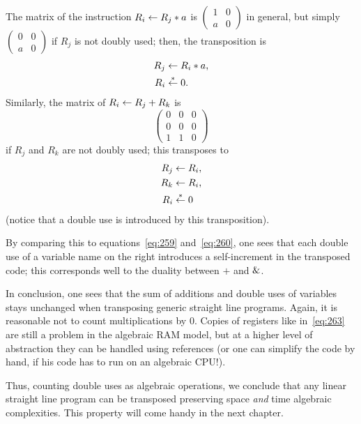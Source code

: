 The matrix of the instruction $R_i\leftarrow R_j*a$ is
$\left(\begin{smallmatrix}1&0\\a&0\end{smallmatrix}\right)$ in
general, but simply
$\left(\begin{smallmatrix}0&0\\a&0\end{smallmatrix}\right)$ if $R_j$
is not doubly used; then, the transposition is
\begin{equation}
  \label{eq:262}
  \begin{aligned}
    R_j&\leftarrow R_i*a\text{,}\\
    R_i&\overset{*}{\leftarrow} 0\text{.}
  \end{aligned}
\end{equation}
Similarly, the matrix of $R_i\leftarrow R_j+R_k$ is 
\begin{equation}
  \label{eq:265}
  \begin{pmatrix}
    0 & 0 & 0\\
    0 & 0 & 0\\
    1 & 1 & 0
  \end{pmatrix}
\end{equation}
if $R_j$ and $R_k$ are not doubly used; this transposes to
\begin{equation}
  \label{eq:263}
  \begin{aligned}
    R_j &\leftarrow R_i\text{,}\\
    R_k &\leftarrow R_i\text{,}\\
    R_i &\overset{*}{\leftarrow} 0
  \end{aligned}
\end{equation}
(notice that a double use is introduced by this transposition).

By comparing this to equations~\eqref{eq:259} and~\eqref{eq:260}, one
sees that each double use of a variable name on the right introduces a
self-increment in the transposed code; this corresponds well to the
duality between $+$ and $\operatorname{\&}$. 

In conclusion, one sees that the sum of additions and double uses of
variables stays unchanged when transposing generic straight line
programs. Again, it is reasonable not to count multiplications by $0$.
Copies of registers like in~\eqref{eq:263} are still a problem in the
algebraic RAM model, but at a higher level of abstraction they can be
handled using references (or one can simplify the code by hand, if his
code has to run on an algebraic CPU!).

Thus, counting double uses as algebraic operations, we conclude that
any linear straight line program can be transposed preserving space
\emph{and} time algebraic complexities. This property will come handy
in the next chapter.


